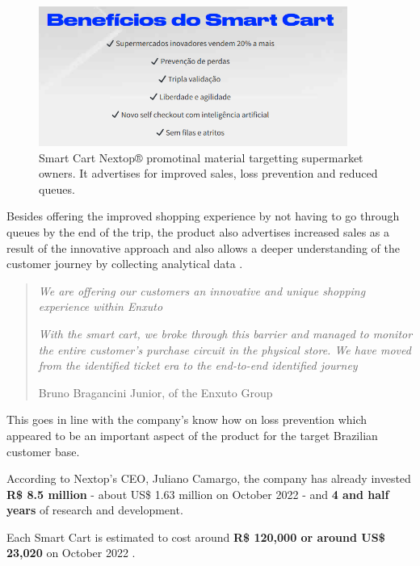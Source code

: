 \documentclass[openright]{normas-utf-tex} %
\begin{document}
\begin{figure}[H]
	\centering
	\includegraphics[width=0.9\textwidth]{./images/nextoppromo.png}
    \caption[Smart Cart Nextop® promotional material targetting supermarket owners]{Smart Cart Nextop® promotinal material targetting supermarket owners. It advertises for improved sales, loss prevention and reduced queues.}
	\label{fig:nextopui}
\end{figure}

Besides offering the improved shopping experience by not having to go through
queues by the end of the trip, the product also advertises increased sales as a
result of the innovative approach and also allows a deeper understanding of the
customer journey by collecting analytical data \cite{Paraiba2022}.

\begin{quote}
\textit{We are offering our customers an innovative and unique shopping experience within Enxuto}

\textit{With the smart cart, we broke through this barrier and managed to monitor the
entire customer's purchase circuit in the physical store. We have moved
from the identified ticket era to the end-to-end identified journey}

    Bruno Bragancini Junior,  of the Enxuto Group \cite{Paraiba2022}
\end{quote}


This goes in line with the
company's know how on loss prevention which appeared to be an important aspect
of the product for the target Brazilian customer base.


According to Nextop's CEO, Juliano Camargo, the company has already invested \textbf{R\$ 8.5 million} - about US\$ 1.63 million on October 2022 - and \textbf{4 and half years}
of research and development.

Each Smart Cart is estimated to cost around \textbf{R\$ 120,000  or around US\$ 23,020} on October 2022 \cite{Paraiba2022}.
\end{document}
